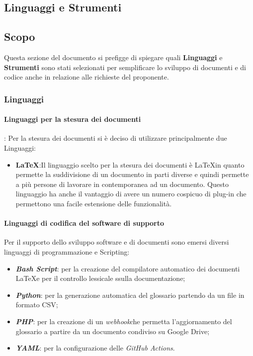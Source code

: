 \subsection{Linguaggi e Strumenti}
\subsection{Scopo}
Questa sezione del documento si prefigge di spiegare quali \textbf{Linguaggi} e
\textbf{Strumenti} sono stati selezionati per semplificare lo sviluppo di documenti
e di codice anche in relazione alle richieste del proponente.
\subsubsection{Linguaggi}
\paragraph{Linguaggi per la stesura dei documenti}:
Per la stesura dei documenti si è deciso di utilizzare principalmente due Linguaggi:
  \begin{itemize}
    \item \textbf{\LaTeX}:Il linguaggio scelto per la stesura dei documenti è \LaTeX \space in quanto permette
    la suddivisione di un documento in parti diverse e quindi permette a più persone
    di lavorare in contemporanea ad un documento.
    Questo linguaggio ha anche il vantaggio di avere un numero cospicuo di plug-in
    che permettono una facile estensione delle funzionalità.
  \end{itemize}

\paragraph{Linguaggi di codifica del software di supporto}
Per il supporto dello sviluppo software e di documenti sono emersi diversi linguaggi
di programmazione e Scripting:
 \begin{itemize}
   \item \textbf{\textit{Bash Script\glos}}: per la creazione del compilatore automatico dei documenti \LaTeX e per il controllo lessicale ssulla documentazione;
   \item \textbf{\textit{Python\glos}}: per la generazione automatica del glossario partendo da un file in formato CSV;
   \item \textbf{\textit{PHP\glos}}: per la creazione di un \textit{webhook}\glo che permetta l'aggiornamento del glossario a partire da un documento condiviso su Google Drive;
   \item \textbf{\textit{YAML\glos}}: per la configurazione delle \textit{GitHub Actions\glos}.
 \end{itemize}

